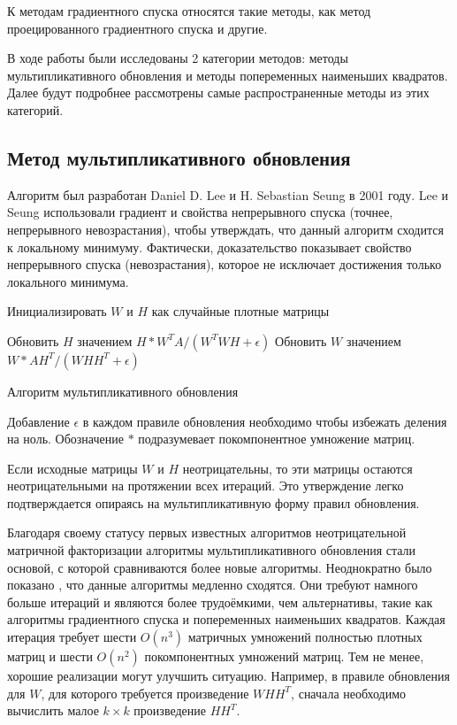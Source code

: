 К методам градиентного спуска относятся такие методы, как метод проецированного градиентного спуска \cite{lin} и другие.

В ходе работы были исследованы 2 категории методов: методы мультипликативного обновления и методы попеременных наименьших квадратов.
Далее будут подробнее рассмотрены самые распространенные методы из этих категорий.



\newpage



\subsection{Метод мультипликативного обновления}

Алгоритм был разработан Daniel D. Lee и H. Sebastian Seung в 2001 году.
Lee и Seung использовали градиент и свойства непрерывного спуска (точнее, непрерывного невозрастания),
чтобы утверждать, что данный алгоритм сходится к локальному минимуму.
Фактически, доказательство показывает свойство непрерывного спуска (невозрастания),
которое не исключает достижения только локального минимума.

\begin{algorithm}
  \BlankLine
  \BlankLine


  \BlankLine

  Инициализировать $W$ и $H$ как случайные плотные матрицы\;

   {
    Обновить $H$ значением $H * W^T A / (W^T W H + \epsilon)$\;
    Обновить $W$ значением $W * A H^T / (W H H^T + \epsilon)$\;
  }

  \BlankLine

  \caption{Алгоритм мультипликативного обновления}
\end{algorithm}

Добавление $\epsilon$ в каждом правиле обновления необходимо чтобы избежать деления на ноль.
Обозначение $*$ подразумевает покомпонентное умножение матриц.

Если исходные матрицы $W$ и $H$ неотрицательны, то эти матрицы остаются неотрицательными на протяжении всех итераций.
Это утверждение легко подтверждается опираясь на мультипликативную форму правил обновления.

Благодаря своему статусу первых известных алгоритмов неотрицательной матричной факторизации
алгоритмы мультипликативного обновления стали основой,
с которой сравниваются более новые алгоритмы.
Неоднократно было показано \cite{langville}, что данные алгоритмы медленно сходятся.
Они требуют намного больше итераций и являются более трудоёмкими, чем альтернативы, такие как алгоритмы градиентного спуска и попеременных наименьших квадратов.
Каждая итерация требует шести $O(n^3)$ матричных умножений полностью плотных матриц и шести $O(n^2)$ покомпонентных умножений матриц.
Тем не менее, хорошие реализации могут улучшить ситуацию.
Например, в правиле обновления для $W$, для которого требуется произведение $WHH^T$, сначала необходимо вычислить малое $k \times k$ произведение $HH^T$.

